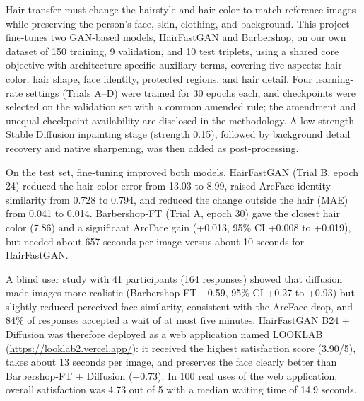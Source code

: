 Hair transfer must change the hairstyle and hair color to match reference images
while preserving the person's face, skin, clothing, and background.
This project fine-tunes two GAN-based models, HairFastGAN and Barbershop,
on our own dataset of 150 training, 9 validation, and 10 test triplets,
using a shared core objective with architecture-specific auxiliary terms, covering five aspects:
hair color, hair shape, face identity, protected regions, and hair detail.
Four learning-rate settings (Trials A--D) were trained for 30 epochs each,
and checkpoints were selected on the validation set with a common amended rule; the amendment and unequal checkpoint availability are disclosed in the methodology.
A low-strength Stable Diffusion inpainting stage (strength 0.15),
followed by background detail recovery and native sharpening,
was then added as post-processing.

On the test set, fine-tuning improved both models.
HairFastGAN (Trial B, epoch 24) reduced the hair-color error from 13.03 to 8.99,
raised ArcFace identity similarity from 0.728 to 0.794,
and reduced the change outside the hair (MAE) from 0.041 to 0.014.
Barbershop-FT (Trial A, epoch 30) gave the closest hair color (7.86)
and a significant ArcFace gain (+0.013, 95\% CI +0.008 to +0.019),
but needed about 657 seconds per image versus about 10 seconds for HairFastGAN.

A blind user study with 41 participants (164 responses) showed that
diffusion made images more realistic (Barbershop-FT +0.59, 95\% CI +0.27 to +0.93)
but slightly reduced perceived face similarity, consistent with the ArcFace drop,
and 84\% of responses accepted a wait of at most five minutes.
HairFastGAN B24 + Diffusion was therefore deployed as a web application named LOOKLAB (\url{https://looklab2.vercel.app/}):
it received the highest satisfaction score (3.90/5), takes about 13 seconds per image,
and preserves the face clearly better than Barbershop-FT + Diffusion (+0.73).
In 100 real uses of the web application, overall satisfaction was 4.73 out of 5
with a median waiting time of 14.9 seconds.
